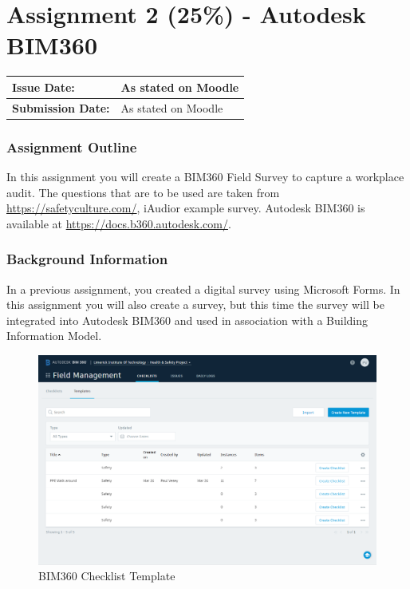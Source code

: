 
	
\part*{Assignment 2 (25\%) - Autodesk BIM360}

\begin{tabularx}{\textwidth}{ |X|X| }
	\hline
	\textbf{Issue Date:} & As stated on Moodle \\
	\hline 
	\textbf{Submission Date:}  & As stated on Moodle  \\
	\hline
\end{tabularx}


\section*{Assignment Outline}


In this assignment you will create a BIM360 Field Survey to capture a workplace audit.  The questions that are to be used are taken from \href{https://safetyculture.com/}{https://safetyculture.com/}, iAudior example survey.   Autodesk BIM360 is available at \href{https://docs.b360.autodesk.com/}{https://docs.b360.autodesk.com/}.


\section*{Background Information}

In a previous assignment, you created a digital survey using Microsoft Forms.  In this assignment you will also create a survey, but this time the survey will be integrated into Autodesk BIM360 and used in association with a Building Information Model.


\begin{figure}
	\centering
	\includegraphics[width=1.0\linewidth]{./Assignments/img/Template.png}
	\caption{BIM360 Checklist Template}
	\label{fig:BIM369ChecklistTemplate}
\end{figure}


